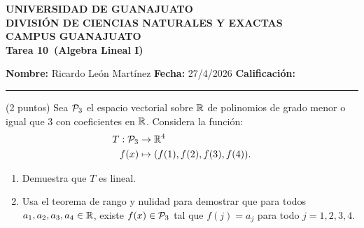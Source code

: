 \documentclass[12pt,a4paper]{article}
\newcommand{\alumno}{Ricardo León Martínez}
\newcommand{\materia}{Algebra Lineal I}
\newcommand{\tarea}{Tarea 10}
\newcommand{\fecha}{27/4/2026}
\begin{document}
    \begin{center}
        {\large\textbf{UNIVERSIDAD DE GUANAJUATO}}\\[0.3cm]
        {\normalsize\textbf{DIVISIÓN DE CIENCIAS NATURALES Y EXACTAS}}\\
        {\normalsize\textbf{CAMPUS GUANAJUATO}}\\[1cm]

        {\Large\textbf{\tarea\ (\materia)}}\\[1cm]
    \end{center}

    \noindent
    \textbf{Nombre:} \alumno 
    \hfill 
    \textbf{Fecha:} \fecha 
    \hfill 
    \textbf{Calificación:} \rule{3cm}{0.4pt}

    \vspace{0.3cm}

    \begin{mdframed}[style=mdpinkbox,frametitle={Ejercicio 1}]
        (2 puntos) Sea $\mathcal{P}_{3}$ el espacio vectorial sobre $\mathbb{R}$ de polinomios de grado menor
        o igual que 3 con coeficientes en $\mathbb{R}$. Considera la función:
        \begin{align*}
            T:\mathcal{P}_{3}&\to\mathbb{R}^{4}\\
            f(x)&\mapsto(f(1),f(2),f(3),f(4)).
        \end{align*}
        \begin{enumerate}
            \item[(a)] Demuestra que $T$ es lineal.
            \item[(b)] Usa el teorema de rango y nulidad para demostrar que para todos
            $a_{1},a_{2},a_{3},a_{4}\in\mathbb{R}$, existe $f(x)\in\mathcal{P}_{3}$ tal que $f(j)=a_{j}$
            para todo $j=1,2,3,4$. 
        \end{enumerate}
    \end{mdframed}
\end{document}
